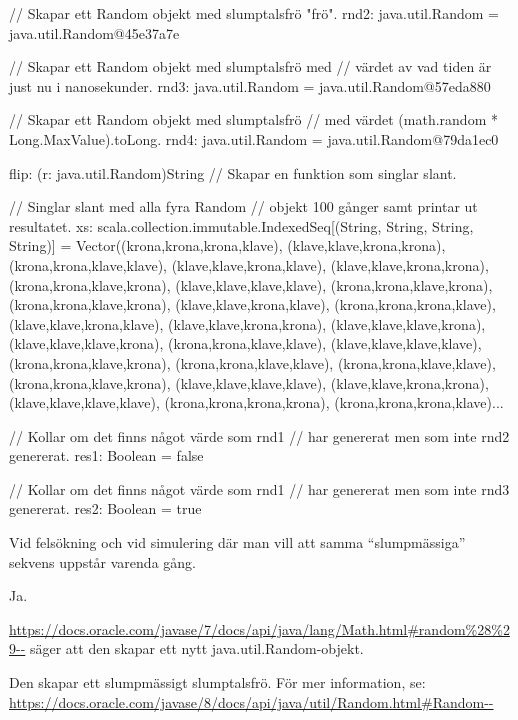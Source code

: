 {\begin{REPL}
  // Skapar ett Random objekt med slumptalsfrö "frö".
rnd2: java.util.Random = java.util.Random@45e37a7e 

  // Skapar ett Random objekt med slumptalsfrö med 
  // värdet av vad tiden är just nu i nanosekunder.
rnd3: java.util.Random = java.util.Random@57eda880 

  // Skapar ett Random objekt med slumptalsfrö 
  // med värdet (math.random * Long.MaxValue).toLong.
rnd4: java.util.Random = java.util.Random@79da1ec0 

flip: (r: java.util.Random)String // Skapar en funktion som singlar slant.

  // Singlar slant med alla fyra Random 
  // objekt 100 gånger samt printar ut resultatet.
xs: scala.collection.immutable.IndexedSeq[(String, String, String, String)] = 
Vector((krona,krona,krona,klave), (klave,klave,krona,krona), (krona,krona,klave,klave), 
(klave,klave,krona,klave), (klave,klave,krona,krona), (krona,krona,klave,krona), 
(klave,klave,klave,klave), (krona,krona,klave,krona), (krona,krona,klave,krona), 
(klave,klave,krona,klave), (krona,krona,krona,klave), (klave,klave,krona,klave), 
(klave,klave,krona,krona), (klave,klave,klave,krona), (klave,klave,klave,krona), 
(krona,krona,klave,klave), (klave,klave,klave,klave), (krona,krona,klave,krona), 
(krona,krona,klave,klave), (krona,krona,klave,klave), (krona,krona,klave,krona), 
(klave,klave,klave,klave), (klave,klave,krona,krona), (klave,klave,klave,klave), 
(krona,krona,krona,krona), (krona,krona,krona,klave)... 

  // Kollar om det finns något värde som rnd1
  // har genererat men som inte rnd2 genererat.
res1: Boolean = false 

  // Kollar om det finns något värde som rnd1
  // har genererat men som inte rnd3 genererat.
res2: Boolean = true 

\end{REPL}

\Subtask Vid felsökning och vid simulering där man vill att samma “slumpmässiga” sekvens uppstår varenda gång.

\Subtask Ja.

\Subtask \url{https://docs.oracle.com/javase/7/docs/api/java/lang/Math.html#random%28%29--} säger att den skapar ett nytt java.util.Random-objekt.

\Subtask Den skapar ett slumpmässigt slumptalsfrö. För mer information, se: \url{https://docs.oracle.com/javase/8/docs/api/java/util/Random.html#Random--}


\Task %

}
